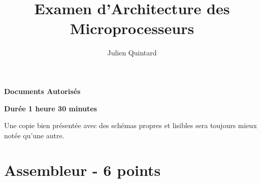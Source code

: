 %
%
%
%
%
%

%
%

%
%

\def\path{../../../..}

%
%



%
%


%
%

\title{Examen d'Architecture des Microprocesseurs}

%
%

\author{\small{Julien Quintard}}

%
%



%
%

\maketitle

%
%

\indentation{}

%
%

\begin{center}

\textbf{Documents Autoris\'es}

\textbf{Dur\'ee 1 heure 30 minutes}

\scriptsize{Une copie bien pr\'esent\'ee avec des sch\'emas propres et
	    lisibles sera toujours mieux not\'ee qu'une autre.}

\end{center}

%
%

%
%

\section{Assembleur - 6 points}

